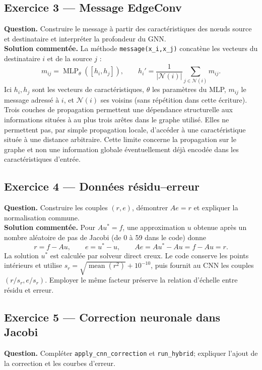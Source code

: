 \documentclass[11pt,a4paper]{article}
\begin{document}
\subsection{Exercice 3 --- Message EdgeConv}

\textbf{Question.} Construire le message à partir des caractéristiques
des nœuds source et destinataire et interpréter la profondeur du GNN.
\\

\textbf{Solution commentée.} La méthode \texttt{message(x\_i,x\_j)}
concatène les vecteurs du destinataire $i$ et de la source $j$ :
\[
m_{ij}=\operatorname{MLP}_{\theta}([h_i,h_j]),\qquad
h_i'=\frac{1}{|\mathcal N(i)|}\sum_{j\in\mathcal N(i)}m_{ij}.
\]
Ici $h_i,h_j$ sont les vecteurs de caractéristiques, $\theta$ les
paramètres du MLP, $m_{ij}$ le message adressé à $i$, et
$\mathcal N(i)$ ses voisins (sans répétition dans cette écriture).
Trois couches de propagation permettent une dépendance structurelle
aux informations situées à au plus trois arêtes dans le graphe
utilisé. Elles ne permettent pas, par simple propagation locale,
d'accéder à une caractéristique située à une distance arbitraire.
Cette limite concerne la propagation sur le graphe et non une
information globale éventuellement déjà encodée dans les
caractéristiques d'entrée.

\subsection{Exercice 4 --- Données résidu--erreur}

\textbf{Question.} Construire les couples $(r,e)$, démontrer $Ae=r$
et expliquer la normalisation commune.
\\

\textbf{Solution commentée.} Pour $Au^*=f$, une approximation
$u$ obtenue après un nombre aléatoire de pas de Jacobi (de 0 à 59
dans le code) donne
\[
r=f-Au,\qquad e=u^*-u,\qquad
Ae=Au^*-Au=f-Au=r.
\]
La solution $u^*$ est calculée par solveur direct creux. Le code
conserve les points intérieurs et utilise
$s_r=\sqrt{\operatorname{mean}(r^2)}+10^{-10}$, puis fournit au
CNN les couples $(r/s_r,e/s_r)$. Employer le même facteur préserve
la relation d'échelle entre résidu et erreur.

\subsection{Exercice 5 --- Correction neuronale dans Jacobi}

\textbf{Question.} Compléter \texttt{apply\_cnn\_correction} et
\texttt{run\_hybrid}; expliquer l'ajout de la correction et les
courbes d'erreur.
\\
\end{document}
